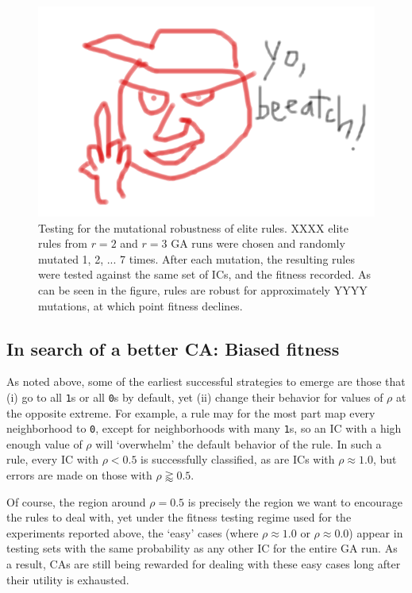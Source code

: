 \begin{figure}
\begin{center}
\includegraphics[width=\linewidth]{foo.png}
\caption{Testing for the mutational robustness of elite rules. XXXX elite rules from $r = 2$ and $r = 3$ GA runs were chosen and randomly mutated 1, 2, ... 7 
times. After each mutation, the resulting rules were tested against the same set of ICs, and the fitness recorded. As can be seen in the figure, 
rules are robust for approximately YYYY mutations, at which point fitness declines.}
\label{fig:robustness}
\end{center}
\end{figure}

\subsection{In search of a better CA: Biased fitness} \label{sec:2_3}

As noted above, some of the earliest successful strategies to emerge are those that (i) go to all \texttt{1}s or all \texttt{0}s by default, 
yet (ii) change their behavior for values of $\rho$ at the opposite extreme. For example, a rule may for the most part map every 
neighborhood to \texttt{0}, except for neighborhoods with many \texttt{1}s, so an IC with a high enough value of $\rho$ will 
`overwhelm' the default behavior of the rule. In such a rule, every IC with $\rho < 0.5$ is successfully classified, as are ICs with $\rho \approx 1.0$, but 
errors are made on those with $\rho \gtrapprox 0.5$.

Of course, the region around $\rho = 0.5$ is precisely the region we want to encourage the rules to deal with, yet under the fitness testing regime 
used for the experiments reported above, the `easy' cases (where $\rho \approx 1.0$ or $\rho \approx 0.0$) appear in testing sets  
with the same probability as any other IC for the entire GA run. As a result, CAs are still being rewarded for dealing with these easy cases long after their 
utility is exhausted.

